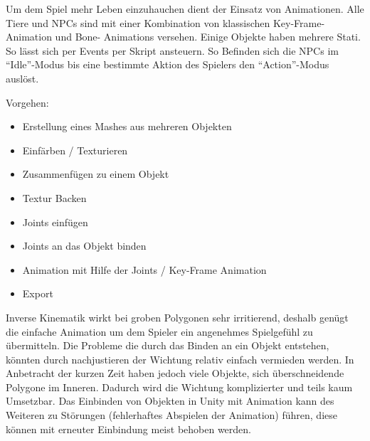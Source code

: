 
Um dem Spiel mehr Leben einzuhauchen dient der Einsatz von Animationen. Alle Tiere und NPCs sind mit einer Kombination von klassischen Key-Frame-Animation und Bone- Animations versehen. Einige Objekte haben mehrere Stati. So lässt sich per Events per Skript ansteuern. So Befinden sich die NPCs im \enquote{Idle}-Modus bis eine bestimmte Aktion des Spielers den \enquote{Action}-Modus auslöst.

Vorgehen:
\begin{itemize}
\item Erstellung eines Mashes aus mehreren Objekten
\item Einfärben / Texturieren
\item Zusammenfügen zu einem Objekt
\item Textur Backen
\item Joints einfügen
\item Joints an das Objekt binden
\item Animation mit Hilfe der Joints / Key-Frame Animation
\item Export
\end{itemize}

Inverse Kinematik wirkt bei groben Polygonen sehr irritierend, deshalb genügt die einfache Animation um dem Spieler ein angenehmes Spielgefühl zu übermitteln. Die Probleme die durch das Binden an ein Objekt entstehen, könnten durch nachjustieren der Wichtung relativ einfach vermieden werden. In Anbetracht der kurzen Zeit haben jedoch viele Objekte, sich überschneidende Polygone im Inneren. Dadurch wird die Wichtung komplizierter und teils kaum Umsetzbar. Das Einbinden von Objekten in Unity mit Animation kann des Weiteren zu Störungen (fehlerhaftes Abspielen der Animation) führen, diese können mit erneuter Einbindung meist behoben werden. 
